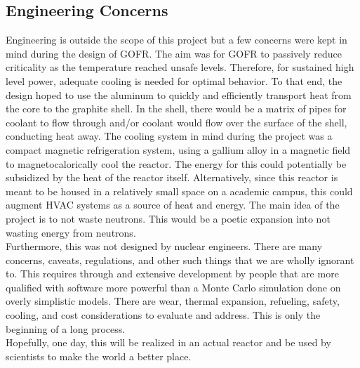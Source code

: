 \subsection{Engineering Concerns}

Engineering is outside the scope of this project but a few concerns were kept in mind during the design of GOFR. The aim was for GOFR to passively reduce criticality as the temperature reached unsafe levels. Therefore, for sustained high level power, adequate cooling is needed for optimal behavior. To that end, the design hoped to use the aluminum to quickly and efficiently transport heat from the core to the graphite shell. In the shell, there would be a matrix of pipes for coolant to flow through and/or coolant would flow over the surface of the shell, conducting heat away. The cooling system in mind during the project was a compact magnetic refrigeration system, using a gallium alloy in a magnetic field to magnetocalorically cool the reactor. The energy for this could potentially be subsidized by the heat of the reactor itself. Alternatively, since this reactor is meant to be housed in a relatively small space on a academic campus, this could augment HVAC systems as a source of heat and energy. The main idea of the project is to not waste neutrons. This would be a poetic expansion into not wasting energy from neutrons.\\

Furthermore, this was not designed by nuclear engineers. There are many concerns, caveats, regulations, and other such things that we are wholly ignorant to. This requires through and extensive development by people that are more qualified with software more powerful than a Monte Carlo simulation done on overly simplistic models. There are wear, thermal expansion, refueling, safety, cooling, and cost considerations to evaluate and address. This is only the beginning of a long process.\\

Hopefully, one day, this will be realized in an actual reactor and be used by scientists to make the world a better place.